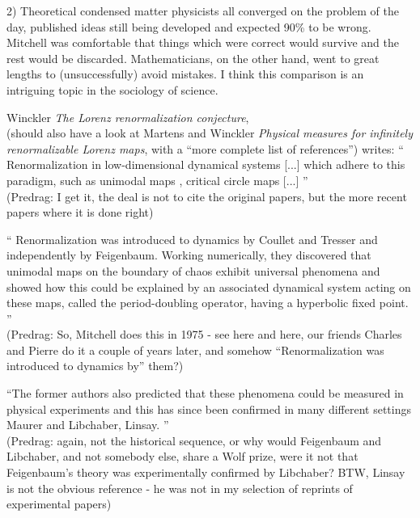 \begin{description}
2) Theoretical condensed matter physicists all converged on the problem
of the day, published ideas still being developed and expected 90\% to be
wrong. Mitchell was comfortable that things which were correct would survive
and the rest would be discarded. Mathematicians, on the other hand, went
to great lengths to (unsuccessfully) avoid mistakes. I think this
comparison is an intriguing topic in the sociology of science.

\newpage %
\item[2018-05-03 Bj{\"o}rn]
{Winckler}
{\em The {Lorenz} renormalization conjecture}, \\
(should also have a look at Martens and Winckler {\em
Physical measures for infinitely renormalizable {Lorenz} maps}, with a
``more complete list of references'')
writes: ``
Renormalization in low-dimensional dynamical systems [...] which adhere
to this paradigm, such as unimodal maps
\cite{Sullivan92,McMullen96,AviLyu11}, critical circle maps
\cite{deFaria92,Yampolsky03} [...]
''
\\(Predrag: I get it, the deal is not to cite the original papers,
but the more recent papers where it is done right)

``
Renormalization was introduced to dynamics by Coullet and
Tresser and independently by Feigenbaum.
Working numerically, they discovered that unimodal maps on the boundary
of chaos exhibit universal phenomena and showed how this could be
explained by an associated dynamical system acting on these maps, called
the period-doubling operator, having a hyperbolic fixed point.
''
\\(Predrag: So, Mitchell does this in 1975 - see
 {here}
and  {here}, our
friends Charles and Pierre do it a couple of years later, and somehow
``Renormalization was introduced to dynamics by'' them?)

``The former authors also predicted that these phenomena could be
measured in physical experiments and this has since been confirmed in
many different settings Maurer and Libchaber, Linsay.
''
\\(Predrag: again, not the historical sequence, or why would Feigenbaum
and Libchaber, and not somebody else, share a Wolf prize, were it not
that Feigenbaum's theory was experimentally confirmed by Libchaber?
BTW, Linsay is not the obvious reference - he was not
in my selection of reprints of experimental papers)


\end{description}
